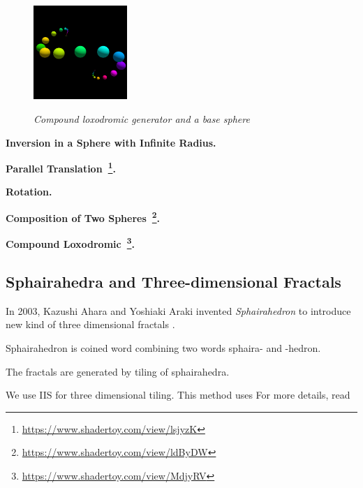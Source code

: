 \begin{figure}[h!tbp]
\begin{minipage}[t]{0.5\hsize}
 \hspace*{\fill}
  \begin{minipage}[t]{0.25\hsize}
   \center
   \includegraphics[width=1.4in, height=1.4in, keepaspectratio]{./img/application/3dGen/compLoxoOneOrb.pdf}
   \label{fig:compLoxoOrb}
  \end{minipage}
  \hspace*{\fill}
  \caption{\textit{Compound loxodromic generator and a base sphere}}
  \label{fig:compLoxo}
 \end{minipage}
\end{figure}

\noindent\textbf{Inversion in a Sphere with Infinite Radius.}

\noindent\textbf{Parallel
Translation~\footnote{\url{https://www.shadertoy.com/view/lsjyzK}}.}

\noindent\textbf{Rotation.}

\noindent\textbf{Composition of Two
Spheres~\footnote{\url{https://www.shadertoy.com/view/ldByDW}}.}

\noindent\textbf{Compound Loxodromic~\footnote{\url{https://www.shadertoy.com/view/MdjyRV}}.}

\subsection{Sphairahedra and Three-dimensional Fractals}


In 2003, Kazushi Ahara and Yoshiaki Araki invented
\textit{Sphairahedron} to introduce new kind of three dimensional
fractals \cite{ahara2003sphairahedral}.

Sphairahedron is coined word combining two words sphaira- and -hedron.

The fractals are generated by tiling of sphairahedra.

We use IIS for three dimensional tiling.
This method uses 
For more details, read \cite{bridges2018:171}